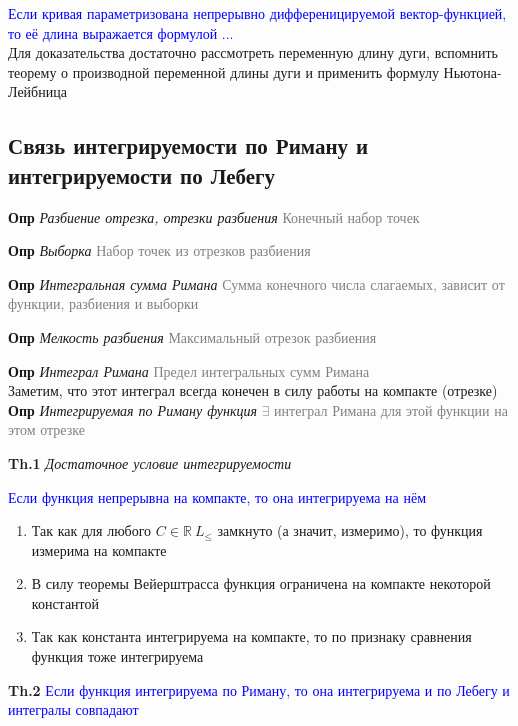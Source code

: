 \textcolor{blue}{Если кривая параметризована непрерывно дифференицируемой вектор-функцией, то её длина выражается
формулой ...} \\

Для доказательства достаточно рассмотреть переменную длину дуги, вспомнить теорему о производной переменной длины
дуги и применить формулу Ньютона-Лейбница

\subsection{Связь интегрируемости по Риману и интегрируемости по Лебегу}

\textbf{Опр} \textit{Разбиение отрезка, отрезки разбиения} \textcolor{gray}{Конечный набор точек}

\textbf{Опр} \textit{Выборка} \textcolor{gray}{Набор точек из отрезков разбиения}

\textbf{Опр} \textit{Интегральная сумма Римана} \textcolor{gray}{Сумма конечного числа слагаемых, зависит от
функции, разбиения и выборки}

\textbf{Опр} \textit{Мелкость разбиения} \textcolor{gray}{Максимальный отрезок разбиения}

\textbf{Опр} \textit{Интеграл Римана} \textcolor{gray}{Предел интегральных сумм Римана} \\

Заметим, что этот интеграл всегда конечен в силу работы на компакте (отрезке) \\

\textbf{Опр} \textit{Интегрируемая по Риману функция} \textcolor{gray}{$\exists$ интеграл Римана для этой функции
на этом отрезке}

\textbf{Th.1} \textit{Достаточное условие интегрируемости}

\textcolor{blue}{Если функция непрерывна на компакте, то она интегрируема на нём}

\begin{enumerate}
    \item Так как для любого $C \in \mathbb{R}~L_{\leq}$ замкнуто (а значит, измеримо), то функция измерима на
    компакте
    \item В силу теоремы Вейерштрасса функция ограничена на компакте некоторой константой
    \item Так как константа интегрируема на компакте, то по признаку сравнения функция тоже интегрируема
\end{enumerate}

\textbf{Th.2} \textcolor{blue}{Если функция интегрируема по Риману, то она интегрируема и по Лебегу и интегралы
совпадают}

